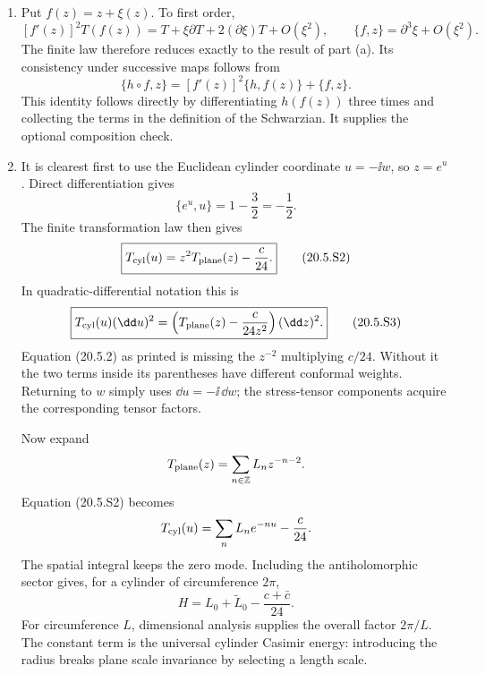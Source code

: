 \begin{enumerate}
\begin{enumerate}
    \item[(b)]
    Put \(f(z)=z+\xi(z)\).  To first order,
    \[
      [f'(z)]^2T(f(z))
        =T+\xi\partial T+2(\partial\xi)T+O(\xi^2),
      \qquad
      \{f,z\}=\partial^3\xi+O(\xi^2).
    \]
    The finite law therefore reduces exactly to the result of part (a).
    Its consistency under successive maps follows from
    \[
      \boxed{\{h\circ f,z\}
        =[f'(z)]^2\{h,f(z)\}+\{f,z\}.}
      \tag{20.5.S1}
    \]
    This identity follows directly by differentiating \(h(f(z))\) three
    times and collecting the terms in the definition of the Schwarzian.
    It supplies the optional composition check.

    \item[(c)]
    It is clearest first to use the Euclidean cylinder coordinate
    \(u=-\ii w\), so \(z=e^u\).  Direct differentiation gives
    \[
      \{e^u,u\}=1-\frac32=-\frac12 .
    \]
    The finite transformation law then gives
    \[
      \boxed{T_{\rm cyl}(u)
        =z^2T_{\rm plane}(z)-\frac{c}{24}.}
      \tag{20.5.S2}
    \]
    In quadratic-differential notation this is
    \[
      \boxed{
      T_{\rm cyl}(u)(\dd u)^2
        =\left(T_{\rm plane}(z)-\frac{c}{24z^2}\right)(\dd z)^2.}
      \tag{20.5.S3}
    \]
    Equation (20.5.2) as printed is missing the \(z^{-2}\) multiplying
    \(c/24\).  Without it the two terms inside its parentheses have
    different conformal weights.  Returning to \(w\) simply uses
    \(\dd u=-\ii\,\dd w\); the stress-tensor components acquire the corresponding
    tensor factors.

    Now expand
    \[
      T_{\rm plane}(z)=\sum_{n\in\mathbb Z}L_nz^{-n-2}.
    \]
    Equation (20.5.S2) becomes
    \[
      T_{\rm cyl}(u)
        =\sum_nL_ne^{-nu}-\frac{c}{24}.
    \]
    The spatial integral keeps the zero mode.  Including the
    antiholomorphic sector gives, for a cylinder of circumference
    \(2\pi\),
    \[
      \boxed{H=L_0+\widetilde L_0-\frac{c+\bar c}{24}.}
    \]
    For circumference \(L\), dimensional analysis supplies the overall
    factor \(2\pi/L\).  The constant term is the universal cylinder
    Casimir energy: introducing the radius breaks plane scale invariance
    by selecting a length scale.
  \end{enumerate}


\end{enumerate}

